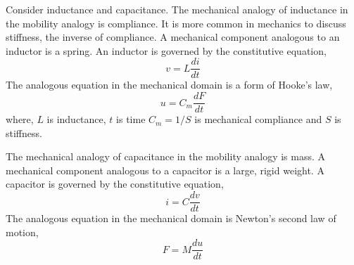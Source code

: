 \documentclass[%
 aip,
 amsmath,amssymb,
 reprint, floatfix%
]{revtex4-1}
\begin{document}
    \par
    Consider inductance and capacitance. The mechanical analogy of inductance in the mobility analogy is compliance. It is more common in mechanics to discuss stiffness, the inverse of compliance. A mechanical component analogous to an inductor is a spring. An inductor is governed by the constitutive equation,
    \begin{equation}
        v = L \dfrac{di}{dt}
    \end{equation}
    The analogous equation in the mechanical domain is a form of Hooke's law,
    \begin{equation}
        u = C_m \dfrac{dF}{dt}
    \end{equation}
    where, $L$ is inductance, $t$ is time $C_m = 1/S$ is mechanical compliance and $S$ is stiffness.
    \par
    The mechanical analogy of capacitance in the mobility analogy is mass. A mechanical component analogous to a capacitor is a large, rigid weight. A capacitor is governed by the constitutive equation,
    \begin{equation}
        i = C \dfrac{dv}{dt}
    \end{equation}
    The analogous equation in the mechanical domain is Newton's second law of motion,
    \begin{equation}
        F = M \dfrac{du}{dt}
    \end{equation}
\end{document}
